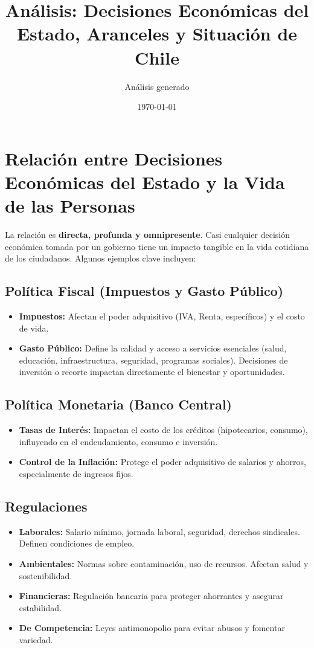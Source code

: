 \documentclass[12pt, a4paper]{article}
\title{Análisis: Decisiones Económicas del Estado, Aranceles y Situación de Chile}
\author{Análisis generado}
\date{\today}
\begin{document}
\maketitle %

\tableofcontents %
\newpage

\section{Relación entre Decisiones Económicas del Estado y la Vida de las Personas}

La relación es \textbf{directa, profunda y omnipresente}. Casi cualquier decisión económica tomada por un gobierno tiene un impacto tangible en la vida cotidiana de los ciudadanos. Algunos ejemplos clave incluyen:

\subsection{Política Fiscal (Impuestos y Gasto Público)}
\begin{itemize}
    \item \textbf{Impuestos:} Afectan el poder adquisitivo (IVA, Renta, específicos) y el costo de vida.
    \item \textbf{Gasto Público:} Define la calidad y acceso a servicios esenciales (salud, educación, infraestructura, seguridad, programas sociales). Decisiones de inversión o recorte impactan directamente el bienestar y oportunidades.
\end{itemize}

\subsection{Política Monetaria (Banco Central)}
\begin{itemize}
    \item \textbf{Tasas de Interés:} Impactan el costo de los créditos (hipotecarios, consumo), influyendo en el endeudamiento, consumo e inversión.
    \item \textbf{Control de la Inflación:} Protege el poder adquisitivo de salarios y ahorros, especialmente de ingresos fijos.
\end{itemize}

\subsection{Regulaciones}
\begin{itemize}
    \item \textbf{Laborales:} Salario mínimo, jornada laboral, seguridad, derechos sindicales. Definen condiciones de empleo.
    \item \textbf{Ambientales:} Normas sobre contaminación, uso de recursos. Afectan salud y sostenibilidad.
    \item \textbf{Financieras:} Regulación bancaria para proteger ahorrantes y asegurar estabilidad.
    \item \textbf{De Competencia:} Leyes antimonopolio para evitar abusos y fomentar variedad.
\end{itemize}
\end{document}
